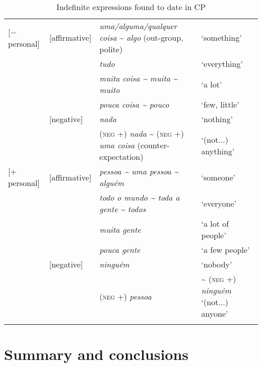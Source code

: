 \documentclass[output=paper,colorlinks,citecolor=brown]{langscibook}
\begin{document}
\begin{table}
    \small
\begin{tabularx}{\textwidth}{llQQ} 
    \lsptoprule 
    {[$-$ personal]} & {[affirmative]} & \textit{uma/alguma/qualquer coisa} \newline \~{} \textit{algo} (out-group, polite) & ‘something’ \\
    \tablevspace
    &  & \textit{tudo} & ‘everything’\\
    \tablevspace
    &  & \textit{muita coisa \~{} muita} \textit{\~{} muito} & ‘a lot’\\
    \tablevspace
    &  & \textit{pouca coisa \~{} pouco} & ‘few, little’\\
    \tablevspace
    & {[negative]} & \textit{nada} & ‘nothing’\\
    \tablevspace
    &  & (\textsc{neg} +) \textit{nada} \newline \~{} (\textsc{neg} +) \textit{uma coisa} \newline (counter-expectation) & ‘(not...) anything’ \\
    \tablevspace
    {[+ personal]} & {[affirmative]} & \textit{pessoa \~{} uma pessoa} \newline \textit{\~{} alguém}& ‘someone’ \\
    \tablevspace
    &  & \textit{todo o mundo \~{} toda a gente} \textit{\~{} todos} & ‘everyone’\\ 
    \tablevspace
    &  & \textit{muita gente} & ‘a lot of people’\\
    &  & \textit{pouca gente} & ‘a few people’ \\
    \tablevspace
    & {[negative]} & \textit{ninguém} & ‘nobody’\\
    \tablevspace
    &  &  (\textsc{neg} +) \textit{pessoa} & \~{} (\textsc{neg} +) \textit{ninguém} ‘(not...) anyone’\\
    \lspbottomrule
    \end{tabularx}
    \caption{Indefinite expressions found to date in CP}
    \label{tab:gut5}
\end{table}

\section{Summary and conclusions}\label{sec:gut5}
\end{document}
